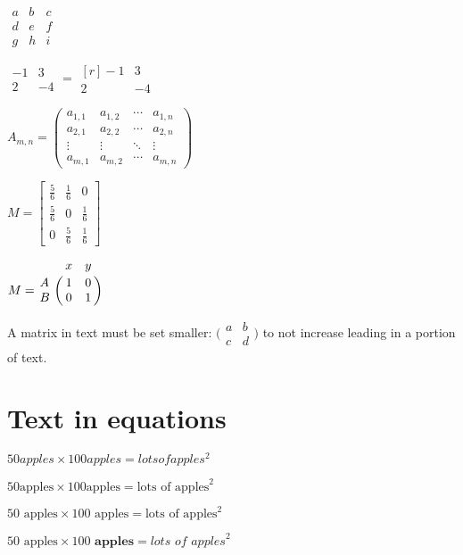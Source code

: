 \documentclass{article}
\begin{document}
$\begin{matrix}
a & b & c \\
d & e & f \\
g & h & i
\end{matrix}$

$\begin{matrix}
-1 & 3 \\
2 & -4
\end{matrix}
=
\begin{matrix*}[r]
-1 & 3 \\
2 & -4
\end{matrix*}$

 
 
 
$A_{m,n} =
\begin{pmatrix}
a_{1,1} & a_{1,2} & \cdots & a_{1,n} \\
a_{2,1} & a_{2,2} & \cdots & a_{2,n} \\
\vdots  & \vdots  & \ddots & \vdots  \\
a_{m,1} & a_{m,2} & \cdots & a_{m,n}
\end{pmatrix}$

$
M = \begin{bmatrix}
       \frac{5}{6} & \frac{1}{6} & 0           \\[0.3em]
       \frac{5}{6} & 0           & \frac{1}{6} \\[0.3em]
       0           & \frac{5}{6} & \frac{1}{6}
     \end{bmatrix}$

$M = \bordermatrix{~ & x & y \cr
                  A & 1 & 0 \cr
                  B & 0 & 1 \cr}$



A matrix in text must be set smaller:
$\bigl(\begin{smallmatrix}
a&b\\ c&d
\end{smallmatrix} \bigr)$
to not increase leading in a portion of text.


\section{Text in equations}

$50 apples \times 100 apples = lots of apples^2$

$50 \text{apples} \times 100 \text{apples}
 = \text{lots of apples}^2$

$50 \text{ apples} \times 100 \text{ apples}
 = \text{lots of apples}^2$

$50 \textrm{ apples} \times 100
 \textbf{ apples} = \textit{lots of apples}^2$
\end{document}
